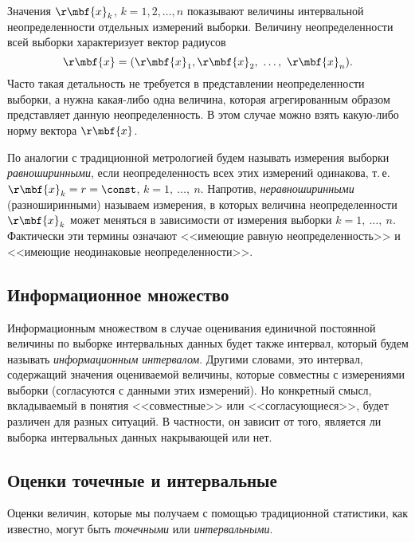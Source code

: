\documentclass[a5paper,openany]{book}
\begin{document}
Значения $\r\mbf{x}_k$, $k = 1,2,\ldots,n$ показывают величины интервальной 
неопределенности отдельных измерений выборки. Величину 
неопределенности всей выборки характеризует вектор радиусов 
\begin{equation*}
	\r\mbf{x} = (\r\mbf{x}_{1}, \r\mbf{x}_{2}, \ \ldots, \ \r\mbf{x}_{n}).
\end{equation*} 
Часто такая детальность не требуется  в представлении неопределенности выборки, 
а нужна какая-либо одна величина, которая агрегированным образом представляет данную 
неопределенность. В этом случае можно взять какую-либо норму вектора $\r\mbf{x}$.

По аналогии с традиционной метрологией будем называть измерения выборки 
\textit{равноширинными}, если неопределенность всех этих измерений одинакова, т.\,е. 
$\r\mbf{x}_k = r = \const$, $k = 1, \ \ldots, \ n$. Напротив, \textit{неравноширинными} 
(разноширинными) называем измерения, в которых величина неопределенности $\r\mbf{x}_k$ 
может меняться в зависимости от измерения выборки $k = 1, \ \ldots, \ n$. Фактически эти 
термины  означают  <<имеющие равную неопределенность>>  и  <<имеющие неодинаковые 
неопределенности>>.  



\subsection{Информационное множество} 
\label{InfoSetSect}

Информационным множеством в случае оценивания единичной постоянной величины по выборке 
интервальных данных будет также интервал, который будем называть \emph{информационным 
	интервалом}. Другими словами, это интервал, содержащий значения оцениваемой величины, 
которые совместны с измерениями выборки (согласуются с данными этих измерений). 
Но конкретный смысл, вкладываемый в понятия <<совместные>> или <<согласующиеся>>, будет 
различен для разных ситуаций. В частности, он зависит от того, является ли выборка  
интервальных данных накрывающей или нет. 

\subsection{Оценки точечные и интервальные} 
\label{EstPointInte}

Оценки величин, которые мы получаем с помощью традиционной статистики, как известно, 
могут быть \emph{точечными} или \emph{интервальными}. 
\end{document}

